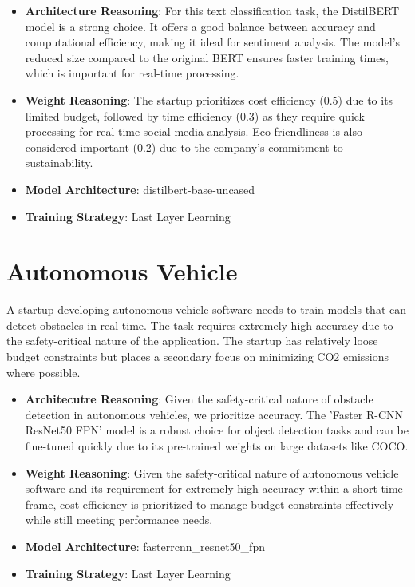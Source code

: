 \documentclass{report}
\begin{document}
\begin{itemize}
    \item \textbf{Architecture Reasoning}: For this text classification task, the DistilBERT model is a strong choice. It offers a good balance between accuracy and computational efficiency, making it ideal for sentiment analysis. The model’s reduced size compared to the original BERT ensures faster training times, which is important for real-time processing.

    \item \textbf{Weight Reasoning}: The startup prioritizes cost efficiency (0.5) due to its limited budget, followed by time efficiency (0.3) as they require quick processing for real-time social media analysis. Eco-friendliness is also considered important (0.2) due to the company’s commitment to sustainability.

    \item \textbf{Model Architecture}: distilbert-base-uncased

    \item \textbf{Training Strategy}: Last Layer Learning
\end{itemize}



\section{Autonomous Vehicle}

A startup developing autonomous vehicle software needs to train models that can detect obstacles in real-time. The task requires extremely high accuracy due to the safety-critical nature of the application. The startup has relatively loose budget constraints but places a secondary focus on minimizing CO2 emissions where possible.

\begin{itemize}
    \item \textbf{Architecutre Reasoning}: Given the safety-critical nature of obstacle detection in autonomous vehicles, we prioritize accuracy. The 'Faster R-CNN ResNet50 FPN' model is a robust choice for object detection tasks and can be fine-tuned quickly due to its pre-trained weights on large datasets like COCO. 
    
    \item \textbf{Weight Reasoning}: Given the safety-critical nature of autonomous vehicle software and its requirement for extremely high accuracy within a short time frame, cost efficiency is prioritized to manage budget constraints effectively while still meeting performance needs. 
    
    \item \textbf{Model Architecture}: fasterrcnn\_resnet50\_fpn 
    
    \item \textbf{Training Strategy}:  Last Layer Learning 
\end{itemize}
\end{document}

